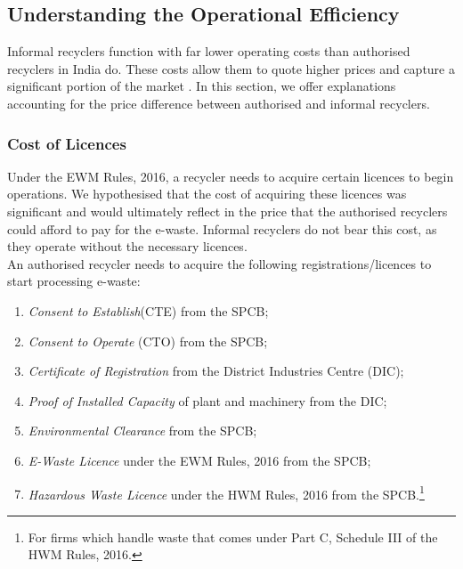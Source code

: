 \documentclass[a4paper, 12pt]{article}
\begin{document}
                    \subsection{Understanding the Operational Efficiency}
                    
                    Informal recyclers function with far lower operating costs than authorised recyclers in India do. These costs allow them to quote higher prices and capture a significant portion of the market \parencite{chintanreport}. In this section, we offer explanations accounting for the price difference between authorised and informal recyclers. 
                    
                    \subsubsection{Cost of Licences}
                    
                    Under the EWM Rules, 2016, a recycler needs to acquire certain licences to begin operations. We hypothesised that the cost of acquiring these licences was significant and would ultimately reflect in the price that the authorised recyclers could afford to pay for the e-waste. Informal recyclers do not bear this cost, as they operate without the necessary licences. \\
                    
                    An authorised recycler needs to acquire the following registrations/licences to start processing e-waste:                  
                    \begin{enumerate}
                      \item \textit{Consent to Establish}(CTE) from the SPCB;
                      \item \textit{Consent to Operate} (CTO) from the SPCB;
                      \item \textit{Certificate of Registration} from the District Industries Centre (DIC);
                      \item \textit{Proof of Installed Capacity} of plant and machinery from the DIC;
                      \item \textit{Environmental Clearance} from the SPCB; 
                      \item \textit{E-Waste Licence} under the EWM Rules, 2016 from the SPCB;
                      \item \textit{Hazardous Waste Licence} under the HWM Rules, 2016 from the SPCB.\footnote{For firms which handle waste that comes under Part C, Schedule III of the HWM Rules, 2016.} 
                    \end{enumerate}
                    
\end{document}
